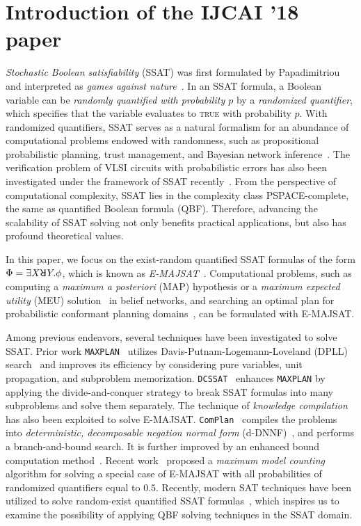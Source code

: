 \section{Introduction of the IJCAI '18 paper}
\textit{Stochastic Boolean satisfiability} (SSAT) was first formulated by Papadimitriou and interpreted as \emph{games against nature}~\cite{Papadimitriou1985}.
In an SSAT formula, a Boolean variable can be \textit{randomly quantified with probability $p$} by a \textit{randomized quantifier}, which specifies that the variable evaluates to \textsc{true} with probability $p$.
With randomized quantifiers, SSAT serves as a natural formalism for an abundance of computational problems endowed with randomness, such as propositional probabilistic planning, trust management, and Bayesian network inference~\cite{Littman2001,SATHandbook-SSAT,Hnich2011}.
The verification problem of VLSI circuits with probabilistic errors has also been investigated under the framework of SSAT recently~\cite{LeeTC18ProbDesign}.
From the perspective of computational complexity, SSAT lies in the complexity class PSPACE-complete, the same as quantified Boolean formula (QBF).
Therefore, advancing the scalability of SSAT solving not only benefits practical applications, but also has profound theoretical values.

In this paper, we focus on the exist-random quantified SSAT formulas of the form $\Phi=\exists X \random{} Y.\phi$, which is known as \emph{E-MAJSAT}~\cite{Littman1998}.
Computational problems, such as computing a \textit{maximum a posteriori}
(MAP) hypothesis or a \textit{maximum expected utility} (MEU) solution~\cite{Dechter1998} in belief networks, and searching an optimal plan for probabilistic conformant planning domains~\cite{Littman1998}, can be formulated with E-MAJSAT.

Among previous endeavors, several techniques have been investigated to solve SSAT.
Prior work \texttt{MAXPLAN}~\cite{Majercik1998} utilizes Davis-Putnam-Logemann-Loveland (DPLL) search~\cite{Davis1962} and improves its efficiency by considering pure variables, unit propagation, and subproblem memorization.
\texttt{DCSSAT}~\cite{Majercik2005} enhances \texttt{MAXPLAN} by applying the divide-and-conquer strategy to break SSAT formulas into many subproblems and solve them separately.
The technique of \textit{knowledge compilation} has also been exploited to solve E-MAJSAT.
\texttt{ComPlan}~\cite{Huang2006} compiles the problems into \textit{deterministic, decomposable negation normal form} (d-DNNF)~\cite{Darwiche2001,Darwiche2002dDNNF}, and performs a branch-and-bound search.
It is further improved by an enhanced bound computation method~\cite{Pipatsrisawat2009}.
Recent work~\cite{Fremont2017} proposed a \textit{maximum model counting} algorithm for solving a special case of E-MAJSAT with all probabilities of randomized quantifiers equal to $0.5$.
Recently, modern SAT techniques have been utilized to solve random-exist quantified SSAT formulas~\cite{LeeIJCAI17RESSAT}, which inspires us to examine the possibility of applying QBF solving techniques in the SSAT domain.

